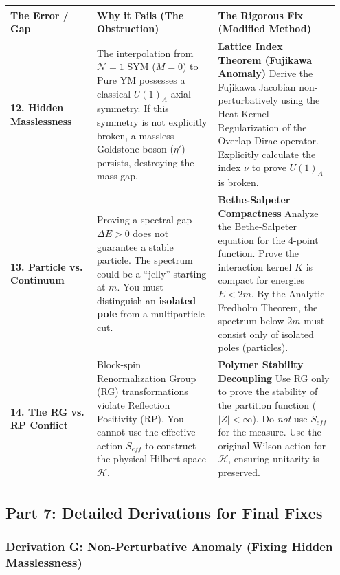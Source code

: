 \begin{center}
\begin{tabular}{|p{0.25\linewidth}|p{0.35\linewidth}|p{0.35\linewidth}|}
\hline
\textbf{The Error / Gap} & \textbf{Why it Fails (The Obstruction)} & \textbf{The Rigorous Fix (Modified Method)} \\
\hline
\textbf{12. Hidden Masslessness} & The interpolation from $\mathcal{N}=1$ SYM ($M=0$) to Pure YM possesses a classical $U(1)_A$ axial symmetry. If this symmetry is not explicitly broken, a massless Goldstone boson ($\eta'$) persists, destroying the mass gap. & \textbf{Lattice Index Theorem (Fujikawa Anomaly)} \newline Derive the Fujikawa Jacobian non-perturbatively using the Heat Kernel Regularization of the Overlap Dirac operator. Explicitly calculate the index $\nu$ to prove $U(1)_A$ is broken. \\
\hline
\textbf{13. Particle vs. Continuum} & Proving a spectral gap $\Delta E > 0$ does not guarantee a stable particle. The spectrum could be a ``jelly'' starting at $m$. You must distinguish an \textbf{isolated pole} from a multiparticle cut. & \textbf{Bethe-Salpeter Compactness} \newline Analyze the Bethe-Salpeter equation for the 4-point function. Prove the interaction kernel $K$ is compact for energies $E < 2m$. By the Analytic Fredholm Theorem, the spectrum below $2m$ must consist only of isolated poles (particles). \\
\hline
\textbf{14. The RG vs. RP Conflict} & Block-spin Renormalization Group (RG) transformations violate Reflection Positivity (RP). You cannot use the effective action $S_{eff}$ to construct the physical Hilbert space $\mathcal{H}$. & \textbf{Polymer Stability Decoupling} \newline Use RG only to prove the stability of the partition function ($|Z| < \infty$). Do \textit{not} use $S_{eff}$ for the measure. Use the original Wilson action for $\mathcal{H}$, ensuring unitarity is preserved. \\
\hline
\end{tabular}
\end{center}

\subsection{Part 7: Detailed Derivations for Final Fixes}

\subsubsection{Derivation G: Non-Perturbative Anomaly (Fixing Hidden Masslessness)}

